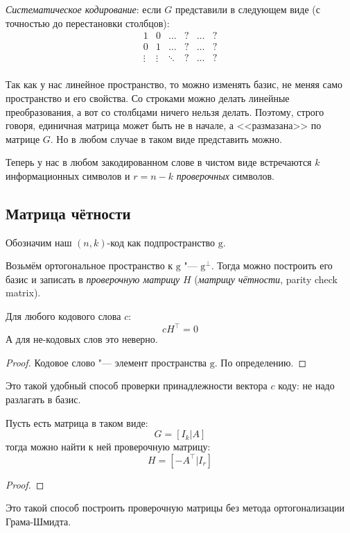 \begin{Def}
	\textit{Систематическое кодирование}:
	если $G$ представили в следующем виде (с точностью до перестановки столбцов):
	\[
	\begin{array}{ccc|cc}
		1 & 0 & \dots & ? & \dots & ? \\
		0 & 1 & \dots & ? & \dots & ? \\
		\vdots & \vdots & \ddots & ? & \dots & ? \\
	\end{array}
	\]
\end{Def}
\begin{Rem}
	Так как у нас линейное пространство, то можно изменять базис,
	не меняя само пространство и его свойства.
	Со строками можно делать линейные преобразования,
	а вот со столбцами ничего нельзя делать.
	Поэтому, строго говоря, единичная матрица может быть не в начале,
	а <<размазана>> по матрице $G$.
	Но в любом случае в таком виде представить можно.
\end{Rem}
\begin{Def}
	Теперь у нас в любом закодированном слове
	в чистом виде встречаются $k$ информационных символов
	и $r=n-k$ \textit{проверочных} символов.
\end{Def}

\subsection{Матрица чётности}
Обозначим наш $(n, k)$-код как подпространство $\mathrm g$.

\begin{Def}
Возьмём ортогональное пространство к $\mathrm g$ "--- $\mathrm g^{\bot}$.
Тогда можно построить его базис и записать в \textit{проверочную матрицу} $H$
(\textit{матрицу чётности}, parity check matrix).
\end{Def}
\begin{lemma}
	Для любого кодового слова $c$:
	\[
		c H^\top = 0
	\]
	А для не-кодовых слов это неверно.
\end{lemma}
\begin{proof}
	Кодовое слово "--- элемент пространства $\mathrm g$.
	По определению.
	\TODO
\end{proof}
\begin{Rem}
	Это такой удобный способ проверки принадлежности вектора $c$
	коду: не надо разлагать в базис.
\end{Rem}

\begin{lemma}
	Пусть есть матрица в таком виде:
	\[
		G = [ I_k | A ]
	\]
	тогда можно найти к ней проверочную матрицу:
	\[
		H = [ -A^\top | I_r ]
	\]
\end{lemma}
\begin{proof}
	\TODO
\end{proof}
\begin{Rem}
	Это такой способ построить проверочную матрицы
	без метода ортогонализации Грама-Шмидта.
\end{Rem}

